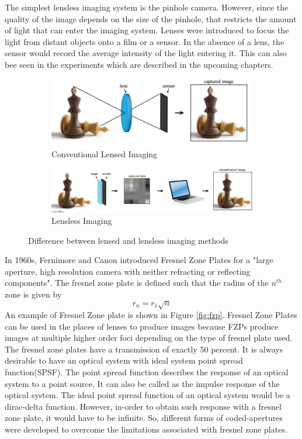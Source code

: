 The simplest lensless imaging system is the pinhole camera. However, since the quality of the image depends on the size of the pinhole, that restricts the amount of light that can enter the imaging system. Lenses were introduced to focus the light from distant objects onto a film or a sensor. In the absence of a lens, the sensor would record the average intensity of the light entering it. This can also bee seen in the experiments which are described in the upcoming chapters. 
\begin{figure}[ht]
\centering
\begin{subfigure}{\textwidth}
  \centering
  \includegraphics[width=0.75\linewidth]{pics/lensless_1}
  \caption{Conventional Lensed Imaging}
  \label{fig:lensed_imaging}
\end{subfigure}
\begin{subfigure}{\textwidth}
  \centering
  \includegraphics[width=0.75\linewidth]{pics/lensless_2}
  \caption{Lensless Imaging}
  \label{fig:lensless_imaging}
\end{subfigure}
\caption{Difference between lensed and lensless imaging methods\cite{VBoomi}}
\label{fig:lensvslensless}
\end{figure}

In 1960s, Fernimore and Canon introduced Fresnel Zone Plates for a "large aperture, high resolution camera with neither refracting or reflecting components"\cite{Cannon1}. The fresnel zone plate is defined such that the radius of the $n^{th}$ zone is given by 
\begin{equation}
r_n  = r_1 \sqrt{n}
\end{equation}
An example of Fresnel Zone plate is shown in Figure \ref{fig:fzp}. Fresnel Zone Plates can be used in the places of lenses to produce images because FZPs produce images at multiple higher order foci depending on the type of fresnel plate used. The fresnel zone plates have a transmission of exactly 50 percent. It is always desirable to have an optical system with ideal system point spread function(SPSF). The point spread function describes the response of an optical system to a point source. It can also be called as the impulse response of the optical system. The ideal point spread function of an optical system would be a dirac-delta function. However, in-order to obtain such response with a fresnel zone plate, it would have to be infinite. So, different forms of coded-apertures were developed to overcome the limitations associated with fresnel zone plates. 

